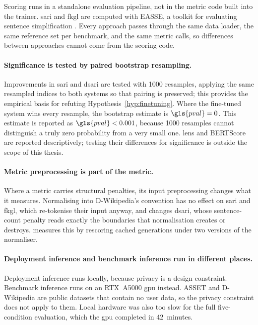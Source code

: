 Scoring runs in a standalone evaluation pipeline, not in the metric code built into the trainer.
\Gls{sari} and \gls{fkgl} are computed with EASSE, a toolkit for evaluating sentence simplification \parencite[49--50]{alva-manchego-etal-2019-easse}.
Every approach passes through the same data loader, the same reference set per benchmark, and the same metric calls, so differences between approaches cannot come from the scoring code.

\paragraph{Significance is tested by paired bootstrap resampling.}
Improvements in \gls{sari} and \gls{dsari} are tested \parencite[393]{koehn-2004-statistical} with \num{1000} resamples, applying the same resampled indices to both systems so that pairing is preserved; this provides the empirical basis for refuting Hypothesis~\cref{hyp:finetuning}.
Where the fine-tuned system wins every resample, the bootstrap estimate is \(\gls{pval} = 0\).
This estimate is reported as \(\gls{pval} < 0.001\), because \num{1000} resamples cannot distinguish a truly zero probability from a very small one.
\Gls{lens} and BERTScore are reported descriptively; testing their differences for significance is outside the scope of this thesis.

\pagebreak

\paragraph{Metric preprocessing is part of the metric.}
Where a metric carries structural penalties, its input preprocessing changes what it measures.
Normalising into D-Wikipedia's convention has no effect on \gls{sari} and \gls{fkgl}, which re-tokenise their input anyway, and changes \gls{dsari}, whose sentence-count penalty reads exactly the boundaries that normalisation creates or destroys.
 measures this by rescoring cached generations under two versions of the normaliser.

\paragraph{Deployment inference and benchmark inference run in different places.}
Deployment inference runs locally, because privacy is a design constraint.
Benchmark inference runs on an RTX~A5000 \gls{gpu} instead.
ASSET and D-Wikipedia are public datasets that contain no user data, so the privacy constraint does not apply to them.
Local hardware was also too slow for the full five-condition evaluation, which the \gls{gpu} completed in 42~minutes.


